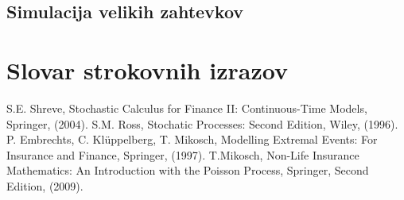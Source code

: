 \documentclass[12pt, a4paper, reqno]{amsart}
\theoremstyle{definition} %
\theoremstyle{plain} %
\newcommand{\geslo}[2]{\noindent\textbf{#1}\hspace*{3mm}\hangindent=\parindent\hangafter=1 #2}
\newcommand{\1}{\mathds{1}}
\begin{document}
    \subsection{Simulacija velikih zahtevkov}


        



        
        

























\section*{Slovar strokovnih izrazov}

%
%


\begin{thebibliography}{99}

S.E. Shreve, Stochastic Calculus for Finance II: Continuous-Time Models, Springer, (2004).
S.M. Ross, Stochatic Processes: Second Edition, Wiley, (1996).
P. Embrechts, C. Klüppelberg, T. Mikosch, Modelling Extremal Events: For Insurance and Finance, Springer, (1997).
T.Mikosch, Non-Life Insurance Mathematics: An Introduction with the Poisson Process, Springer, Second Edition, (2009).
\end{thebibliography}
\end{document}
